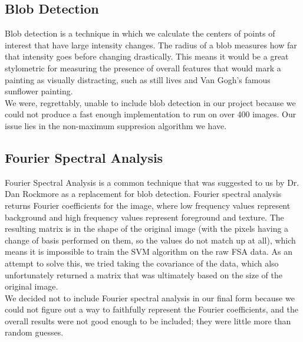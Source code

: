 \documentclass[twocolumn]{article}
\begin{document}
  \subsection{Blob Detection}
  Blob detection is a technique in which we calculate the centers of points of
  interest that have large intensity changes. The radius of a blob measures
  how far that intensity goes before changing drastically. This means it would
  be a great stylometric for measuring the presence of overall features that
  would mark a painting as visually distracting, such as still lives and Van
  Gogh's famous sunflower painting. \\

  We were, regrettably, unable to include blob detection in our project
  because we could not produce a fast enough implementation to run on over 400
  images. Our issue lies in the non-maximum suppresion algorithm we have.

  \subsection{Fourier Spectral Analysis}
  Fourier Spectral Analysis is a common technique that was suggested to us by
  Dr. Dan Rockmore as a replacement for blob detection. Fourier spectral
  analysis returns Fourier coefficients for the image, where low frequency
  values represent background and high frequency values represent foreground
  and texture. The resulting matrix is in the shape of the original image
  (with the pixels having a change of basis performed on them, so the values
  do not match up at all), which means it is impossible to train the SVM
  algorithm on the raw FSA data. As an attempt to solve this, we tried taking
  the covariance of the data, which also unfortunately returned a matrix that
  was ultimately based on the size of the original image. \\

  We decided not to include Fourier spectral analysis in our final form
  because we could not figure out a way to faithfully represent the Fourier
  coefficients, and the overall results were not good enough to be included;
  they were little more than random guesses.
\end{document}
